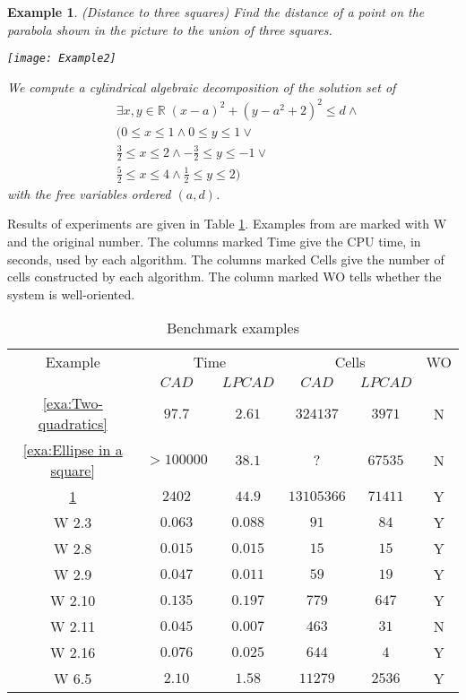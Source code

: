 \documentclass[english]{amsart}
\providecommand{\tabularnewline}{\\}
\numberwithin{equation}{section}
\numberwithin{figure}{section}
\newtheorem{example}[thm]{Example}
\begin{document}
\begin{example}
\label{exa:Distance to three squares}(Distance to three squares)
Find the distance of a point on the parabola shown in the picture
to the union of three squares.

\texttt{[image: Example2]}

We compute a cylindrical algebraic decomposition of the solution set
of\begin{eqnarray*}
 & \exists x,y\in\mathbb{R}\;(x-a)^{2}+(y-a^{2}+2)^{2}\leq d\wedge\\
 & (0\leq x\leq1\wedge0\leq y\leq1\vee\\
 & \frac{3}{2}\leq x\leq2\wedge-\frac{3}{2}\leq y\leq-1\vee\\
 & \frac{5}{2}\leq x\leq4\wedge\frac{1}{2}\leq y\leq2)\end{eqnarray*}
with the free variables ordered $(a,d)$.
\end{example}
Results of experiments are given in Table \ref{tab:Benchmark-examples}.
Examples from \cite{W2} are marked with W and the original number.
The columns marked Time give the CPU time, in seconds, used by each
algorithm. The columns marked Cells give the number of cells constructed
by each algorithm. The column marked WO tells whether the system is
well-oriented.

\begin{table}


\caption{\label{tab:Benchmark-examples}Benchmark examples}
\begin{tabular}{|c|c|c|c|c|c|}
\hline 
Example & \multicolumn{2}{c|}{Time} & \multicolumn{2}{c|}{Cells} & WO\tabularnewline
\cline{2-5} 
 & $CAD$ & $LPCAD$ & $CAD$ & $LPCAD$ & \tabularnewline
\hline 
\ref{exa:Two-quadratics} & $97.7$ & $2.61$ & $324137$ & $3971$ & N\tabularnewline
\hline 
\ref{exa:Ellipse in a square} & $>100000$ & $38.1$ & $?$ & $67535$ & N\tabularnewline
\hline 
\ref{exa:Distance to three squares} & $2402$ & $44.9$ & $13105366$ & $71411$ & Y\tabularnewline
\hline 
W 2.3 & $0.063$ & $0.088$ & $91$ & $84$ & Y\tabularnewline
\hline 
W 2.8 & $0.015$ & $0.015$ & $15$ & $15$ & Y\tabularnewline
\hline 
W 2.9 & $0.047$ & $0.011$ & $59$ & $19$ & Y\tabularnewline
\hline 
W 2.10 & $0.135$ & $0.197$ & $779$ & $647$ & Y\tabularnewline
\hline 
W 2.11 & $0.045$ & $0.007$ & $463$ & $31$ & N\tabularnewline
\hline 
W 2.16 & $0.076$ & $0.025$ & $644$ & $4$ & Y\tabularnewline
\hline 
W 6.5 & $2.10$ & $1.58$ & $11279$ & $2536$ & Y\tabularnewline
\hline
\end{tabular}


\end{table}
\end{document}
